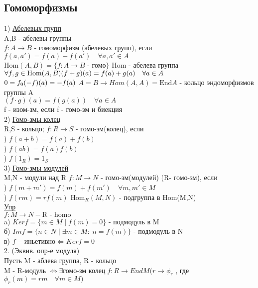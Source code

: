 \documentclass[12pt]{article}
\begin{document}
\subsection*{Гомоморфизмы}
1) \underline{Абелевых групп} \\
A,B - абелевы группы \\
$ f: A \to B $ - гомоморфизм (абелевых групп), если  \\
$ f(a, a') = f(a) + f(a') \quad \forall a,a' \in A $ \\

$ \text{Hom}(A, B) = \{ f: A \to B \text{ - гомо} \} $ Hom - абелева группа \\
$ \forall f,g \in \text{Hom}(A,B) \\
(f+g)(a) = f(a) + g(a) \quad \forall a \in A$ \\
$
0 = f_0 \\
(-f)(a) = -f(a) \\
$
$A = B \to Hom(A,A) = \text{End}A$ - кольцо эндоморфизмов группы A \\
$ (f \cdot g)(a) = f(g(a)) \quad \forall a \in A $ \\
f - изом-зм, если f - гомо-зм и биекция\\
2) \underline{Гомо-змы колец} \\
R,S - кольцо; $ f: R \to S $ - гомо-зм(колец), если \\
) $ f(a+b) = f(a) + f(b) $\\
) $f(ab) = f(a)f(b) $ \\
) $f(1_R) = 1_S $ \\
3) \underline{Гомо-змы модулей} \\
M,N - модули над R $ f: M \to N $ - гомо-зм(модулей) (R- гомо-зм), если \\
) $f(m+m') = f(m) + f(m') \quad \forall m, m' \in M $ \\
) $f(rm) = rf(m) $
$ \text{Hom}_R(M,N) $ - подгруппа в Hom(M,N) \\

\underline{Упр} \\
$ f: M \to N - \text{R - homo } $ \\
a) $ Kerf = \{m\in M \; | \; f(m) = 0 \} $ - подмодуль в M \\
б) $ Imf = \{ n \in N \; | \; \exists m \in M: \; n = f(m) \} $ - подмодуль в N \\
в) $ f - \text{иньетивно} \Leftrightarrow Kerf = 0 $ \\

2. (Эквив. опр-е модуля) \\
Пусть M - аблева группа, R - кольцо \\
M - R-модуль $\Leftrightarrow \exists \text{гомо-зм колец} \; f: R \to EndM
(r \to \phi_r$ , где $\phi_r(m) = rm \quad \forall m \in M) $
\end{document}
